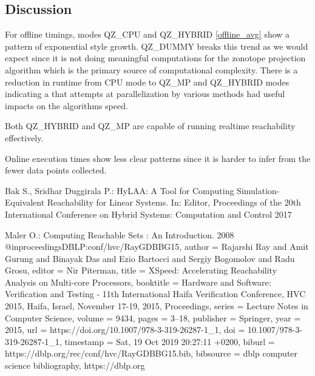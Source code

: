 \documentclass[runningheads]{llncs}
\begin{document}
\subsection{Discussion}

For offline timings, modes QZ\_CPU and QZ\_HYBRID \ref{offline_avg} show a pattern of exponential style growth. QZ\_DUMMY breaks this trend as we would expect since it is not doing meaningful computations for the zonotope projection algorithm which is the primary source of computational complexity. There is a reduction in runtime from CPU mode to QZ\_MP and QZ\_HYBRID modes indicating a that attempts at parallelization by various methods had useful impacts on the algorithms speed.

Both QZ\_HYBRID and QZ\_MP are capable of running realtime reachability effectively. 

Online execution times show less clear patterns since it is harder to infer from the fewer data points collected. 

%
%
%
% 
% 
%
\begin{thebibliography}{8}


Bak S., Sridhar Duggirala P.: HyLAA: A Tool for Computing Simulation-Equivalent Reachability for Linear Systems. In: Editor,
Proceedings of the 20th International Conference on Hybrid Systems: Computation and Control 2017

Maler O.: Computing Reachable Sets : An Introduction. 2008
@inproceedings{DBLP:conf/hvc/RayGDBBG15,
  author    = {Rajarshi Ray and
               Amit Gurung and
               Binayak Das and
               Ezio Bartocci and
               Sergiy Bogomolov and
               Radu Grosu},
  editor    = {Nir Piterman},
  title     = {XSpeed: Accelerating Reachability Analysis on Multi-core Processors},
  booktitle = {Hardware and Software: Verification and Testing - 11th International
               Haifa Verification Conference, {HVC} 2015, Haifa, Israel, November
               17-19, 2015, Proceedings},
  series    = {Lecture Notes in Computer Science},
  volume    = {9434},
  pages     = {3--18},
  publisher = {Springer},
  year      = {2015},
  url       = {https://doi.org/10.1007/978-3-319-26287-1\_1},
  doi       = {10.1007/978-3-319-26287-1\_1},
  timestamp = {Sat, 19 Oct 2019 20:27:11 +0200},
  biburl    = {https://dblp.org/rec/conf/hvc/RayGDBBG15.bib},
  bibsource = {dblp computer science bibliography, https://dblp.org}
}
\end{thebibliography}
\end{document}
